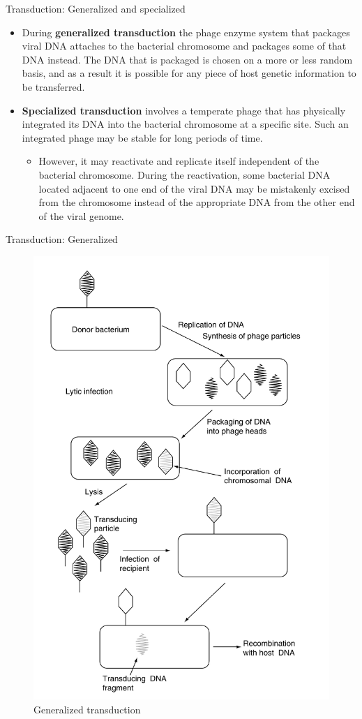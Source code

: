 \documentclass[
  ignorenonframetext,
  aspectratio=169]{beamer}
\providecommand{\tightlist}{%
  \setlength{\itemsep}{0pt}\setlength{\parskip}{0pt}}
\begin{document}
\begin{frame}{Transduction: Generalized and specialized}
\protect\hypertarget{transduction-generalized-and-specialized}{}
\begin{itemize}
\tightlist
\item
  During \textbf{generalized transduction} the phage enzyme system that
  packages viral DNA attaches to the bacterial chromosome and packages
  some of that DNA instead. The DNA that is packaged is chosen on a more
  or less random basis, and as a result it is possible for any piece of
  host genetic information to be transferred.
\item
  \textbf{Specialized transduction} involves a temperate phage that has
  physically integrated its DNA into the bacterial chromosome at a
  specific site. Such an integrated phage may be stable for long periods
  of time.

  \begin{itemize}
  \tightlist
  \item
    However, it may reactivate and replicate itself independent of the
    bacterial chromosome. During the reactivation, some bacterial DNA
    located adjacent to one end of the viral DNA may be mistakenly
    excised from the chromosome instead of the appropriate DNA from the
    other end of the viral genome.
  \end{itemize}
\end{itemize}
\end{frame}

\begin{frame}{Transduction: Generalized}
\protect\hypertarget{transduction-generalized}{}
\begin{figure}
\includegraphics[width=0.25\linewidth]{./../images/transduction_generalized} \caption{Generalized transduction}\label{fig:transduction-gen}
\end{figure}
\end{frame}
\end{document}
